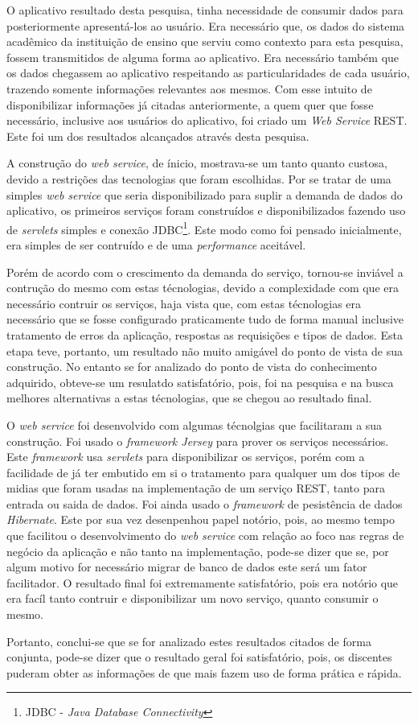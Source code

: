 	\par O aplicativo resultado desta pesquisa, tinha necessidade de consumir
dados para posteriormente apresentá-los ao usuário. Era necessário que, os
dados do sistema acadêmico da instituição de ensino que serviu como contexto
para esta pesquisa, fossem transmitidos de alguma forma ao aplicativo. Era
necessário também que os dados chegassem ao aplicativo respeitando as
particularidades de cada usuário, trazendo somente informações relevantes aos
mesmos. Com esse intuito de disponibilizar informações já citadas
anteriormente, a quem quer que fosse necessário, inclusive aos usuários do
aplicativo, foi criado um \textit{Web Service} REST. Este foi um dos resultados
alcançados através desta pesquisa.
	
	\par A construção do \textit{web service}, de ínicio, mostrava-se um tanto
quanto custosa, devido a restrições das tecnologias que foram escolhidas. Por se
tratar de uma simples \textit{web service} que seria disponibilizado para suplir
a demanda de dados do aplicativo, os primeiros serviços foram construídos e
disponibilizados fazendo uso de \textit{servlets} simples e conexão
JDBC\footnote{JDBC - \textit{Java Database Connectivity}}. Este modo como foi
pensado inicialmente, era simples de ser contruído e de uma
\textit{performance} aceitável. 

	\par Porém de acordo com o crescimento da demanda do serviço, tornou-se
inviável a contrução do mesmo com estas técnologias, devido a complexidade com
que era necessário contruir os serviços, haja vista que, com estas técnologias
era necessário que se fosse configurado praticamente tudo de forma manual
inclusive tratamento de erros da aplicação, respostas as requisições e tipos de
dados. Esta etapa teve, portanto, um resultado não muito amigável do ponto de
vista de sua construção. No entanto se for analizado do ponto de vista do
conhecimento adquirido, obteve-se um resulatdo satisfatório, pois, foi na
pesquisa e na busca melhores alternativas a estas técnologias, que se chegou ao
resultado final.

	\par O \textit{web service} foi desenvolvido com algumas técnolgias que
facilitaram a sua construção. Foi usado o \textit{framework Jersey} para prover
os serviços necessários. Este \textit{framework} usa \textit{servlets} para
disponibilizar os serviços, porém com a facilidade de já ter embutido em si o
tratamento para qualquer um dos tipos de midias que foram usadas na
implementação de um serviço REST, tanto para entrada ou saida de dados. Foi
ainda usado o \textit{framework} de pesistência de dados \textit{Hibernate}.
Este por sua vez desenpenhou papel notório, pois, ao mesmo tempo que facilitou
o desenvolvimento do \textit{web service} com relação ao foco nas regras de
negócio da aplicação e não tanto na implementação, pode-se dizer que se, por
algum motivo for necessário migrar de banco de dados este será um fator
facilitador. O resultado final foi extremamente satisfatório, pois era notório
que era facíl tanto contruir e disponibilizar um novo serviço, quanto consumir
o mesmo.
	
	\par Portanto, conclui-se que se for analizado estes resultados citados de
forma conjunta, pode-se dizer que o resultado geral foi satisfatório, pois, os
discentes puderam obter as informações de que mais fazem uso de forma prática e
rápida.


